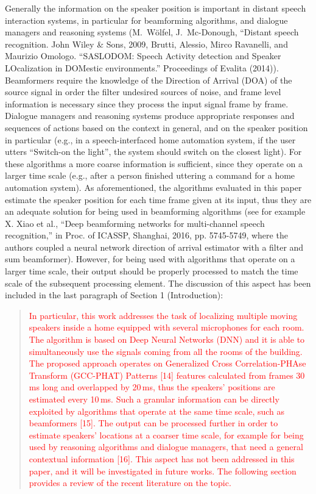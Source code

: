 \documentclass[11pt, technote, letterpaper, oneside, onecolumn]{IEEEtran}
\begin{document}
\begin{enumerate}
Generally the information on the speaker position is important in distant speech interaction systems, in particular for beamforming algorithms, and dialogue managers and reasoning systems (M.\ W\"olfel, J.\ Mc-Donough, ``Distant speech recognition. John Wiley \& Sons, 2009, Brutti, Alessio, Mirco Ravanelli, and Maurizio Omologo. ``SASLODOM: Speech Activity detection and Speaker LOcalization in DOMestic environments.'' Proceedings of Evalita (2014)). Beamformers require the knowledge of the Direction of Arrival (DOA) of the source signal in order the filter undesired sources of noise, and frame level information is necessary since they process the input signal frame by frame. Dialogue managers and reasoning systems produce appropriate responses and sequences of actions based on the context in general, and on the speaker position in particular (e.g., in a speech-interfaced home automation system, if the user utters ``Switch-on the light'', the system should switch on the closest light).  For these algorithms a more coarse information is sufficient, since they operate on a larger time scale (e.g., after a person finished uttering a command for a home automation system). As aforementioned, the algorithms evaluated in this paper estimate the speaker position for each time frame given at its input, thus they are an adequate solution for being used in beamforming algorithms (see for example X. Xiao et al., ``Deep beamforming networks for multi-channel speech recognition,'' in Proc. of ICASSP, Shanghai, 2016, pp. 5745-5749, where the authors coupled a neural network direction of arrival estimator with a filter and sum beamformer). However, for being used with algorithms that operate on a larger time scale, their output should be properly processed to match the time scale of the subsequent processing element. 
The discussion of this aspect has been included in the last paragraph of Section 1 (Introduction):
\begin{quote}
\textcolor{red} {
In particular, this work addresses the task of localizing multiple moving speakers inside a home equipped with several microphones for each room. The algorithm is based on Deep Neural Networks (DNN) and it is able to simultaneously use the signals coming from all the rooms of the building. The proposed approach operates on Generalized Cross Correlation-PHAse Transform (GCC-PHAT) Patterns [14] features calculated from frames 30\,ms long and overlapped by 20\,ms, thus the speakers' positions are estimated every 10\,ms. Such a granular information can be directly exploited by algorithms that operate at the same time scale, such as beamformers [15]. The output can be processed further in order to estimate speakers' locations at a coarser time scale, for example for being used by reasoning algorithms and dialogue managers, that need a general contextual information [16]. This aspect has not been addressed in this paper, and it will be investigated in future works. The following section provides a review of the recent literature on the topic.
}
\end{quote}


\end{enumerate}
\end{document}
